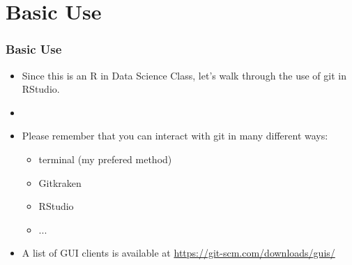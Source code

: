 \section{Basic Use}
\begin{frame}
  \frametitle{Basic Use}
  \begin{itemize}
    \item Since this is an R in Data Science Class, let's walk through the use of
      git in RStudio.
    \item[]
    \item Please remember that you can interact with git in many different ways:
      \begin{itemize}
        \item terminal (my prefered method)
        \item Gitkraken
        \item RStudio
        \item ...
      \end{itemize}
    \item A list of GUI clients is available at \url{https://git-scm.com/downloads/guis/}
  \end{itemize}
\end{frame}
